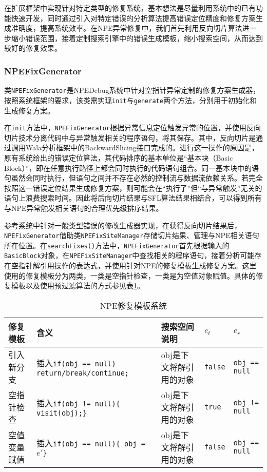 在扩展框架中实现针对特定类型的修复系统，基本想法是尽量利用系统中的已有功能快速开发，同时通过引入对特定错误的分析算法提高错误定位精度和修复方案生成准确度，提高系统效率。在NPE异常修复中，我们首先利用反向切片算法进一步缩小错误范围，接着定制搜索引擎中的错误生成模板，缩小搜索空间，从而达到较好的修复效果。

\subsubsection{NPEFixGenerator}

类\texttt{NPEFixGenerator}是NPEDebug系统中针对空指针异常定制的修复方案生成器，按照系统框架的要求，该类需实现\texttt{init}与\texttt{generate}两个方法，分别用于初始化和生成修复方案。

在\texttt{init}方法中，\texttt{NPEFixGenerator}根据异常信息定位触发异常的位置，并使用反向切片技术分离代码中与异常触发相关的程序语句，将其保存。其中，反向切片是通过调用Wala分析框架中的BackwardSlicing接口完成的。进行这一操作的原因是，原有系统给出的错误定位算法，其代码排序的基本单位是“基本块（Basic Block）”，即在任意执行路径上都会同时执行的代码语句组合。同一基本块中的语句虽然会同时执行，但语句之间并不存在必然的控制流与数据流依赖关系。若完全按照这一错误定位结果生成修复方案，则可能会在“执行了”但“与异常触发”无关的语句上浪费搜索时间。因此将后向切片结果与SFL算法结果相结合，可以得到所有与NPE异常触发相关语句的合理优先级排序结果。

参考系统中针对一般类型错误的修改生成器实现，在获得反向切片结果后，\texttt{NPEFixGenerator}借助类\texttt{NPEFixSiteManager}存储切片结果、管理与NPE相关语句所在位置。在\texttt{searchFixes()}方法中，\texttt{NPEFixGenerator}首先根据输入的\texttt{BasicBlock}对象，在\texttt{NPEFixSiteManager}中查找相关的程序语句，接着分析可能存在空指针解引用操作的表达式，并使用针对NPE的修复模板生成修复方案。这里使用的修复模板分为两类，一类是空指针检查，一类是为空值对象赋值。具体的修复模板以及使用预过滤算法的方式参见表\ref{tab:npe-search-space}。

\begin{table}
	\centering
	\caption{NPE修复模板系统}
	\label{tab:npe-search-space}
	\begin{tabular}{|p{1.3cm}|p{6cm}|p{2.5cm}|p{1.2cm}|p{1.7cm}|}
		\hline
		修复模板                & 含义         & 搜索空间说明 & $e_t$ & $e_r$                                    \\ \hline
		
		引入新分支			& 插入\texttt{if(obj == null) return/break/continue;}
		& obj是下文将解引用的对象		&\texttt{false}  & \texttt{obj == null}				\\ \hline		
	
		空指针检查      & 	插入\texttt{if(obj != null)\{ visit(obj);\}}
		& obj是下文将解引用的对象		&\texttt{true}	&\texttt{obj != null}		 \\ \hline
		
		空值变量赋值      & 	插入\texttt{if(obj == null)\{ obj = $e'$\}}
		& obj是下文将解引用的对象  	&\texttt{false}	&\texttt{obj == null}		 \\ \hline
		
	\end{tabular}
\end{table}

